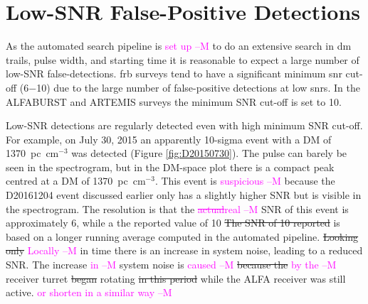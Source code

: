 \documentclass[a4paper,fleqn,usenatbib]{mnras}
\newcommand{\cM}[1]{\textcolor{magenta}{ #1 --M}}
\begin{document}
\section{Low-SNR False-Positive Detections}
\label{sec:low_snr}

As the automated search pipeline is \cM{set up} to do an extensive search in \gls{dm}
trails, pulse width, and starting time it is reasonable to expect a large number
of low-SNR false-detections.  \gls{frb} surveys tend to have a significant
minimum \gls{snr} cut-off (6$-$10) due to the large number of false-positive
detections at low \glspl{snr}.  In the ALFABURST and ARTEMIS
\citep{2015MNRAS.452.1254K} surveys the minimum SNR cut-off is set to 10.

Low-SNR detections are regularly detected even with high minimum SNR cut-off.
For example, on July 30, 2015 an apparently 10-sigma event with a DM of
1370~pc~cm$^{-3}$ was detected (Figure \ref{fig:D20150730}). The pulse can
barely be seen in the spectrogram, but in the DM-space plot there is a compact
peak centred at a DM of 1370~pc~cm$^{-3}$. This event is \cM{suspicious} because the
D20161204 event discussed earlier only has a slightly higher SNR but is visible
in the spectrogram. The resolution is that the \cM{\sout{actual}real} SNR of this event is
approximately 6, while a the reported value of 10 \sout{The SNR of 10 reported} is based on a longer running average
computed in the automated pipeline. \sout{Looking only} \cM{Locally} in time there is an
increase in system noise, leading to a reduced SNR. The increase \cM{in} system noise
is \cM{caused} \sout{because the} \cM{by the} receiver turret \sout{began} rotating \sout{in this period} while the ALFA
receiver was still active. \cM{or shorten in a similar way}
\end{document}
